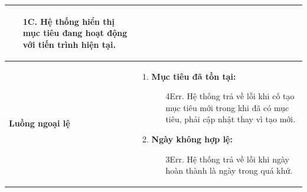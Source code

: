 {\begin{tabularx}{\textwidth}{|>{\raggedright\arraybackslash}X|>{\raggedright\arraybackslash}X|}
\begin{enumerate}
    \begin{enumerate}
        \item[1C.] Hệ thống hiển thị mục tiêu đang hoạt động với tiến trình hiện tại.
    \end{enumerate}
\end{enumerate} \\
\hline
\textbf{Luồng ngoại lệ} &
\begin{enumerate}
    \item \textbf{Mục tiêu đã tồn tại:}
    \begin{enumerate}
        \item[4Err.] Hệ thống trả về lỗi khi cố tạo mục tiêu mới trong khi đã có mục tiêu, phải cập nhật thay vì tạo mới.
    \end{enumerate}
    \item \textbf{Ngày không hợp lệ:}
    \begin{enumerate}
        \item[3Err.] Hệ thống trả về lỗi khi ngày hoàn thành là ngày trong quá khứ.
    \end{enumerate}
\end{enumerate} \\
\hline
\end{tabularx}
}

